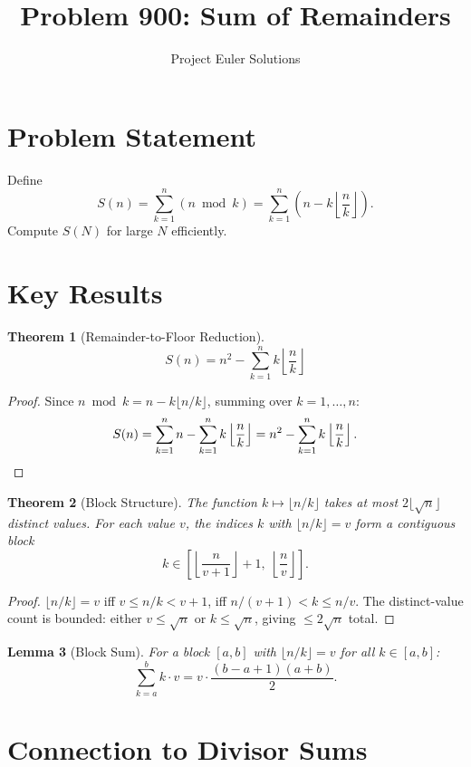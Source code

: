 \documentclass[11pt]{article}
\title{Problem 900: Sum of Remainders}
\author{Project Euler Solutions}
\date{}
\newtheorem{theorem}{Theorem}
\newtheorem{lemma}[theorem]{Lemma}
\begin{document}
\maketitle

\section{Problem Statement}
Define
\[
S(n) = \sum_{k=1}^{n} (n \bmod k) = \sum_{k=1}^{n} \left(n - k\left\lfloor \frac{n}{k} \right\rfloor\right).
\]
Compute $S(N)$ for large $N$ efficiently.

\section{Key Results}

\begin{theorem}[Remainder-to-Floor Reduction]
\[
S(n) = n^2 - \sum_{k=1}^{n} k\left\lfloor \frac{n}{k} \right\rfloor
\]
\end{theorem}

\begin{proof}
Since $n \bmod k = n - k\lfloor n/k \rfloor$, summing over $k=1,\ldots,n$:
\[
S(n) = \sum_{k=1}^n n - \sum_{k=1}^n k\left\lfloor \frac{n}{k}\right\rfloor = n^2 - \sum_{k=1}^n k\left\lfloor \frac{n}{k}\right\rfloor. \qedhere
\]
\end{proof}

\begin{theorem}[Block Structure]
The function $k \mapsto \lfloor n/k \rfloor$ takes at most $2\lfloor\sqrt{n}\rfloor$ distinct values. For each value $v$, the indices $k$ with $\lfloor n/k\rfloor = v$ form a contiguous block
\[
k \in \left[\left\lfloor \frac{n}{v+1}\right\rfloor + 1,\; \left\lfloor \frac{n}{v}\right\rfloor\right].
\]
\end{theorem}

\begin{proof}
$\lfloor n/k \rfloor = v$ iff $v \le n/k < v+1$, iff $n/(v+1) < k \le n/v$. The distinct-value count is bounded: either $v \le \sqrt{n}$ or $k \le \sqrt{n}$, giving $\le 2\sqrt{n}$ total.
\end{proof}

\begin{lemma}[Block Sum]
For a block $[a,b]$ with $\lfloor n/k \rfloor = v$ for all $k \in [a,b]$:
\[
\sum_{k=a}^{b} k \cdot v = v \cdot \frac{(b-a+1)(a+b)}{2}.
\]
\end{lemma}

\section{Connection to Divisor Sums}
\end{document}
